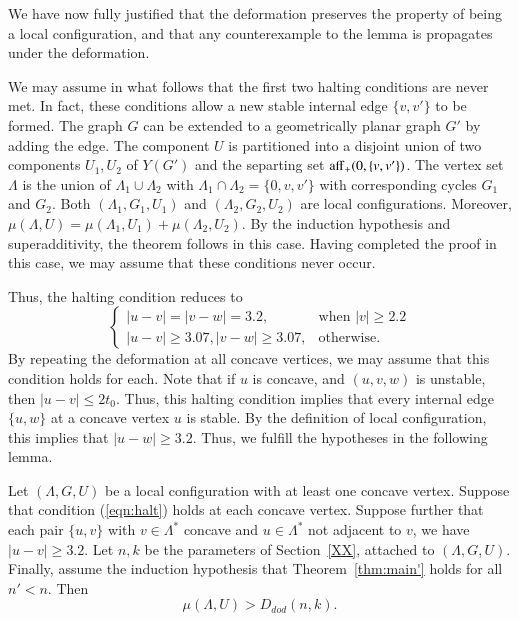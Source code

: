 We have now fully justified that the deformation preserves
the property of being a local configuration, and that
any counterexample to the lemma is propagates under
the deformation.

\smallskip

We may assume in what follows that the first two halting conditions are never
met.  In fact, these conditions allow a new stable internal edge $\{v,v'\}$ to be formed.  The
graph $G$ can be extended to a geometrically planar graph $G'$ by adding the edge.
The component $U$ is partitioned into a disjoint union of two components $U_1,U_2$ 
of $Y(G')$ and the separting set ${\operatorname{aff}}_+(0,\{v,v'\})$.  The vertex set
$\Lambda$ is the union of $\Lambda_1\cup\Lambda_2$ with $\Lambda_1\cap\Lambda_2=\{0,v,v'\}$
with corresponding cycles $G_1$ and $G_2$.  Both $(\Lambda_1,G_1,U_1)$ and $(\Lambda_2,G_2,U_2)$ are local configurations.  Moreover, $\mu(\Lambda,U) = \mu(\Lambda_1,U_1)+\mu(\Lambda_2,U_2)$.  By the induction hypothesis and superadditivity, the theorem follows in this case.
Having completed the proof in this case, we may assume that these conditions never occur.

Thus, the halting condition reduces to 
\begin{equation}\label{eqn:halt}
\begin{cases}
|u-v|=|v-w|=3.2,& \text{when } |v|\ge 2.2\\
|u-v|\ge 3.07, |v-w|\ge 3.07,& \text{otherwise.}
\end{cases}
\end{equation}
By repeating the deformation at all concave vertices, we may assume that this condition
holds for each.  Note that if $u$ is concave, and $(u,v,w)$ is unstable, then
$|u-v|\le 2t_0$.  Thus, this halting condition implies that every internal edge $\{u,w\}$
at a concave vertex $u$ is stable.  By the definition of local configuration, this
implies that $|u-w|\ge 3.2$.  Thus, we fulfill the hypotheses in the following lemma.

\begin{lemma}\label{lemma:concave}  
Let $(\Lambda,G,U)$ be a local configuration with at least one
concave vertex.  Suppose that 
condition (\ref{eqn:halt}) holds at each concave vertex.  Suppose further that each
pair $\{u,v\}$ with $v\in\Lambda^*$ concave and $u\in\Lambda^*$ not adjacent to $v$,
we have $|u-v|\ge 3.2$.   Let $n,k$ be the parameters of Section~\ref{XX}, attached
to $(\Lambda,G,U)$.  Finally, assume the induction hypothesis that Theorem~\ref{thm:main'}
holds for all $n'<n$. Then
   $$\mu(\Lambda,U) > D_{dod}(n,k).$$
\end{lemma}

